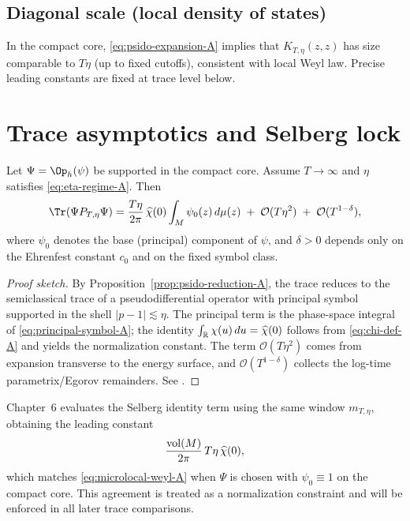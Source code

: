 \subsection{Diagonal scale (local density of states)}\label{subsec:ch5-diagonal}

In the compact core, \eqref{eq:psido-expansion-A} implies that $K_{T,\eta}(z,z)$ has size comparable to $T\eta$
(up to fixed cutoffs), consistent with local Weyl law. Precise leading constants are fixed at trace level below.

\section{Trace asymptotics and Selberg lock}\label{sec:ch5-trace}

\begin{proposition}\label{prop:microlocal-weyl-A}
Let $\Psi=\Op_h(\psi)$ be supported in the compact core. Assume $T\to\infty$ and $\eta$ satisfies \eqref{eq:eta-regime-A}.
Then
\begin{equation}\label{eq:microlocal-weyl-A}
\Tr(\Psi P_{T,\eta}\Psi)
=\frac{T\eta}{2\pi}\,\widehat\chi(0)\int_M \psi_0(z)\,d\mu(z)
\;+\;\mathcal O(T\eta^2)\;+\;\mathcal O(T^{1-\delta}),
\end{equation}
where $\psi_0$ denotes the base (principal) component of $\psi$, and $\delta>0$ depends only on the Ehrenfest constant
$c_0$ and on the fixed symbol class.
\end{proposition}

\begin{proof}[Proof sketch]
By Proposition~\ref{prop:psido-reduction-A}, the trace reduces to the semiclassical trace of a pseudodifferential
operator with principal symbol supported in the shell $|p-1|\lesssim\eta$. The principal term is the phase-space
integral of \eqref{eq:principal-symbol-A}; the identity $\int_{\mathbb{R}} \chi(u)\,du=\widehat\chi(0)$ follows from
\eqref{eq:chi-def-A} and yields the normalization constant. The term $\mathcal O(T\eta^2)$ comes from expansion
transverse to the energy surface, and $\mathcal O(T^{1-\delta})$ collects the log-time parametrix/Egorov remainders.
See \cite{Hormander1983,Zworski2012,DyatlovZworski2019}.
\end{proof}

\begin{remark}\label{rem:selberg-lock-A}
Chapter~6 evaluates the Selberg identity term using the same window $m_{T,\eta}$, obtaining the leading constant
\[
\frac{\mathop{\mathrm{vol}}\nolimits(M)}{2\pi}\,T\eta\,\widehat\chi(0),
\]
which matches \eqref{eq:microlocal-weyl-A} when $\Psi$ is chosen with $\psi_0\equiv 1$ on the compact core.
This agreement is treated as a normalization constraint and will be enforced in all later trace comparisons.
\end{remark}

